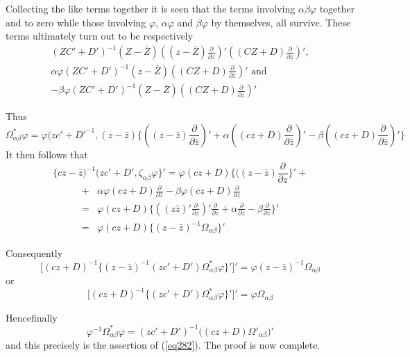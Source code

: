Collecting the like terms together it is seen that the terms involving
$\alpha \beta \varphi $ together and to zero while those involving
$\varphi$, $\alpha \varphi$ and $\beta \varphi$ by themselves, all
survive. These terms ultimately turn out to be respectively  
\begin{gather*}
(ZC' + D')^{-1} (Z - \bar{Z}) ((z - \bar{Z}) \frac{\partial }
  {\partial z})'  (( CZ + D)\frac{\partial } {\partial z})', \\ 
\alpha \varphi  ( ZC' + D')^{-1} (z - \bar{Z}) (( CZ +
D)\frac{\partial } {\partial z})' \text { and } \\ 
- \beta \varphi (Z C' + D')^{-1} (Z - \bar{Z}) (( CZ +
D)\frac{\partial } {\partial z})'  
\end{gather*}

Thus 
$$
\Omega^*_{\alpha \beta} \varphi = \varphi
(zc'+D'^{-1},(z-\bar{z})\bigg \{((z-\bar{z})\frac{\partial}{\partial
  \bar{z}})'+\alpha ((cz+D) \frac{\partial}{\partial
  \bar{z}})'-\beta((cz+D) \frac{\partial}{\partial \bar{z}})'\bigg \} 
$$
It then follows that
$$
\bigg \{cz-\bar{z})^{-1}(zc'+D', \zeta_{\alpha \beta} \varphi \bigg
\}'=\varphi (cz+D)\bigg \{ ((z-\bar{z}) \frac {\partial}{\partial
  z}\bigg \}'+ 
$$
\begin{align*}
+ & \alpha \varphi (cz+D)\frac{\partial}{\partial \bar{z}}- \beta
\varphi (cz+D)\frac{\partial}{\partial z}\\ 
= & \varphi (cz+D) \bigg\{((z \bar{z})'\frac{\partial}{\partial z})'
\frac{\partial}{\partial z}+\alpha\frac{\partial}{\partial z}-\beta
\frac{\partial}{\partial z}\bigg \}'\\ = &\varphi
(cz+D)\bigg\{(z-\bar{z})^{-1} \Omega_{\alpha \beta}\bigg \}' 
\end{align*} 

Consequently
$$
\bigg[ (cz+D)^{-1}\bigg\{(z-\bar{z})^{-1}(zc'+D')\Omega^*_{\alpha
    \beta} \varphi \bigg \}' \bigg ]' = \varphi
(z-\bar{z})^{-1}\Omega_{\alpha \beta} 
$$
or 
$$
\bigg[ (cz+D)^{-1}\bigg\{(zc'+D')\Omega^*_{\alpha \beta} \varphi \bigg
  \}' \bigg ]' = \varphi \Omega_{\alpha \beta} 
$$

Hence\pageoriginale finally
$$
\varphi^{-1}\Omega^*_{\alpha \beta} \varphi =(zc'+D')^{-1}\bigg(
(cz+D) \Omega'_{\alpha \beta}\bigg)' 
$$ 
and this precisely is the assertion of (\ref{eq282}). The proof is now
complete. 

